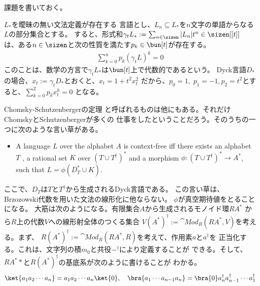 {	\begin{todo}[残りの話題]\label{todo:残りの話題} %
		課題を書いておく。
	\begin{description}\setlength{\itemsep}{-1mm} %
		\item[Chomsky-Schutzenbergerの定理] $L_*$を曖昧の無い文法定義が存在する
		言語とし、$L_n\subseteq L_*$を$n$文字の単語からなる$L$の部分集合とする。
		すると、形式和$\gamma_tL_*:=\sum_{n\in\sizen} |L_n|t^n\in\sizen[[t]]$
		は、ある$n\in\sizen$と次の性質を満たす$p_k\in\bun[t]$が存在する。
		\begin{equation*}\begin{split}
			\sum_{k=0}^n p_k(\gamma_tL)^k = 0
		\end{split}\end{equation*}
		このことは、数学の方言で$\gamma_tL_*$は$\bun[t]$上で代数的であるという。
		Dyck言語$D_*$の場合、$x_t:=\gamma_tD_*$とおくと、$x_t=1+t^2x_t^2$
		だから、$p_0=1,\;p_1=-1,p_2=t^2$とすると、$\sum_{k=0}^2p_kx_t^k=0$
		となる。
		\item[Chomsky-Schutzenbergerの定理その二] Chomsky-Schutzenbergerの定理
		と呼ばれるものは他にもある。それだけChomskyとSchutzenbergerが多くの
		仕事をしたということだろう。そのうちの一つに次のような言い草がある。
		\begin{itemize}\setlength{\itemsep}{-1mm} %
			\item A language $L$ over the alphabet $A$ is context-free iff 
			there exists an alphabet $T$ , a rational set $K$ over 
			$(T\cup T^\dag)^*$ and a morphism $\phi:(T\cup T^\dag)^*\to A^*$, 
			such that $L=\phi(D_T^*\cup K)$.
		\end{itemize} %
		ここで、$D_T$は$T$と$T^\dag$から生成されるDyck言語である。
		この言い草は、Brzozowski代数を用いた文法の線形化に他ならない。
		$\phi$が真空期待値をとることになる。
		大筋は次のようになる。有限集合$A$から生成されるモノイド環$RA^*$
		から$R$上の代数$V$への線形射全体のつくる集合
		$V(A^*)^\dag:=\cat{Mod}_R(RA^*,V)$を考える。まず、
		$R(A^*)^\dag:=\cat{Mod}_R(RA^*,R)$を考えて、作用素$a$と$a^\dag$を
		正当化する。これは、文字列の積$m_0$と共役$-^\dag$により定義することが
		できる。そして、$RA^**$と$R(A^*)^\dag$の基底系が次のように書けることが
		わかる。
		\begin{equation*}\begin{split}
			\ket{a_1a_2\cdots a_n} = a_1a_2\cdots a_n\ket{0}
			,\quad \bra{a_1\cdots a_{n-1}a_n} 
			= \bra{0}a_n^\dag a_{n-1}^\dag\cdots a_1^\dag
		\end{split}\end{equation*}

\end{description}
\end{todo}}
